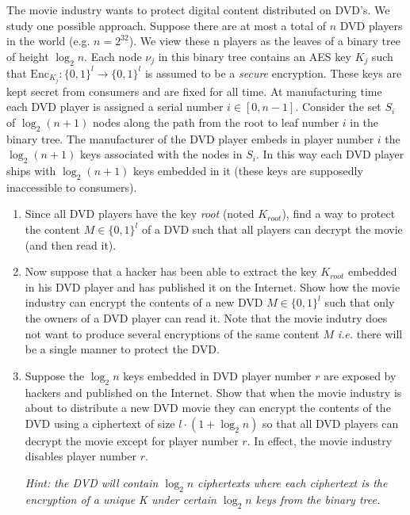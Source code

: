 The movie industry wants to protect digital content distributed on DVD's. We study
one possible approach. Suppose there are at most a total of $n$ DVD players in the world (e.g.
$n=2^{32}$). We view these n players as the leaves of a binary tree of height $\log_2 n$.
Each node $\nu_j$ in this binary tree contains an AES key $K_j$ such that
$\mathrm{Enc}_{K_j}:\{0,1\}^l\rightarrow\{0,1\}^l$ is assumed to be a \emph{secure} encryption.
These keys are kept secret from consumers and are fixed for all time.
At manufacturing time each DVD player is assigned a serial number $i\in\left[0,n-1\right]$.
Consider the set $S_i$ of $\log_2(n+1)$ nodes along the path from the root to leaf number
$i$ in the binary tree. The manufacturer of the DVD player embeds in player number $i$ the
$\log_2(n+1)$ keys associated with the nodes in $S_i$. In this way each DVD player ships with
$\log_2(n+1)$ keys embedded in it (these keys are supposedly inaccessible to consumers).

\begin{enumerate}
	\item Since all DVD players have the key \emph{root} (noted $K_{root}$),
	      find a way to protect the content $M\in\{0,1\}^l$ of a DVD such that all players can decrypt
	      the movie (and then read it).
	\item Now suppose that a hacker has been able to extract the key $K_{root}$ embedded in his
	      DVD player and has published it on the Internet.
	      Show how the movie industry can encrypt the contents of a new DVD $M\in\{0,1\}^l$ such that only
	      the owners of a DVD player can read it.
	      Note that the movie indutry does not want to produce several encryptions of the
	      same content $M$ \emph{i.e.} there will be a single manner to protect the DVD.
	\item Suppose the $\log_2n$ keys embedded in DVD player number $r$ are exposed by hackers
	      and published on the Internet. Show that when the movie industry is about to
	      distribute a new DVD movie they can encrypt the contents of the DVD using a
	      ciphertext of size $l\!\cdot\!(1+\log_2n)$ so that all DVD players can decrypt the movie except
	      for player number $r$. In effect, the movie industry disables player number $r$.

	      \emph{Hint: the DVD will contain $\log_2n$ ciphertexts where each ciphertext is the
	      encryption of a unique K under certain $\log_2n$ keys from the binary tree.}
\end{enumerate}


